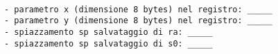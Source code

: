 
\begin{verbatim}

- parametro x (dimensione 8 bytes) nel registro: _____
- parametro y (dimensione 8 bytes) nel registro: _____
- spiazzamento sp salvataggio di ra: _____
- spiazzamento sp salvataggio di s0: _____
  
\end{verbatim}